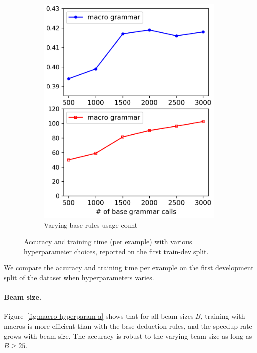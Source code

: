 \begin{figure}[t]
\begin{subfigure}[b]{0.333\textwidth}
\includegraphics[width=1.0\linewidth]{figures/wtq/max_exploration_split_high.png}
\caption{Varying base rules usage count}
\label{fig:macro-hyperparam-c}
\end{subfigure}
\caption[Accuracy and training time with various hyperparameter choices]{
Accuracy and training time (per example) with various
hyperparameter choices, reported on the first train-dev split.
}\label{fig:macro-hyperparam}
\end{figure}

We compare the accuracy and training time per example
on the first development split of the dataset
when hyperparameters varies.

\paragraph{Beam size.}
Figure~\ref{fig:macro-hyperparam-a}
shows that for all beam sizes $B$,
training with macros is more efficient than
with the base deduction rules,
and the speedup rate grows with beam size.
The accuracy is robust to the varying beam size
as long as $B \geq 25$.

